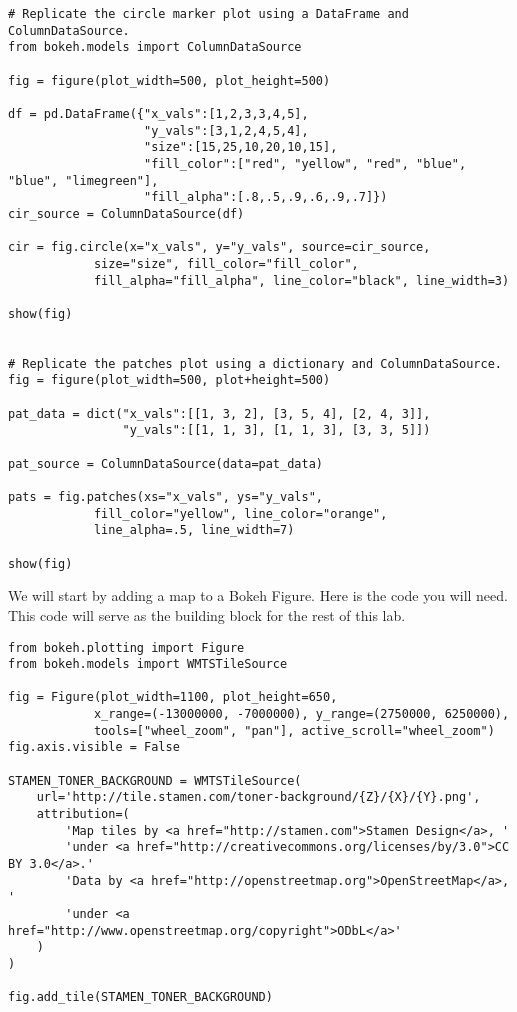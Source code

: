 \begin{lstlisting}
# Replicate the circle marker plot using a DataFrame and ColumnDataSource.
from bokeh.models import ColumnDataSource

fig = figure(plot_width=500, plot_height=500)

df = pd.DataFrame({"x_vals":[1,2,3,3,4,5],
                   "y_vals":[3,1,2,4,5,4],
                   "size":[15,25,10,20,10,15],
                   "fill_color":["red", "yellow", "red", "blue", "blue", "limegreen"],
                   "fill_alpha":[.8,.5,.9,.6,.9,.7]})
cir_source = ColumnDataSource(df)

cir = fig.circle(x="x_vals", y="y_vals", source=cir_source,
            size="size", fill_color="fill_color",
            fill_alpha="fill_alpha", line_color="black", line_width=3)

show(fig)


# Replicate the patches plot using a dictionary and ColumnDataSource.
fig = figure(plot_width=500, plot+height=500)

pat_data = dict("x_vals":[[1, 3, 2], [3, 5, 4], [2, 4, 3]],
                "y_vals":[[1, 1, 3], [1, 1, 3], [3, 3, 5]])

pat_source = ColumnDataSource(data=pat_data)

pats = fig.patches(xs="x_vals", ys="y_vals",
            fill_color="yellow", line_color="orange",
            line_alpha=.5, line_width=7)

show(fig)
\end{lstlisting}

\begin{problem} \label{prob:map}
We will start by adding a map to a Bokeh Figure. Here is the code you will need.
This code will serve as the building block for the rest of this lab.

\begin{lstlisting}
from bokeh.plotting import Figure
from bokeh.models import WMTSTileSource

fig = Figure(plot_width=1100, plot_height=650,
            x_range=(-13000000, -7000000), y_range=(2750000, 6250000),
            tools=["wheel_zoom", "pan"], active_scroll="wheel_zoom")
fig.axis.visible = False

STAMEN_TONER_BACKGROUND = WMTSTileSource(
    url='http://tile.stamen.com/toner-background/{Z}/{X}/{Y}.png',
    attribution=(
        'Map tiles by <a href="http://stamen.com">Stamen Design</a>, '
        'under <a href="http://creativecommons.org/licenses/by/3.0">CC BY 3.0</a>.'
        'Data by <a href="http://openstreetmap.org">OpenStreetMap</a>, '
        'under <a href="http://www.openstreetmap.org/copyright">ODbL</a>'
    )
)

fig.add_tile(STAMEN_TONER_BACKGROUND)
\end{lstlisting}

\end{problem}

